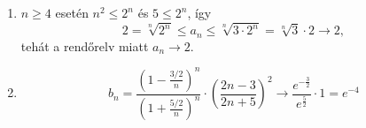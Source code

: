 \documentclass[11pt]{scrartcl}
\begin{document}
\begin{enumerate}
	\item $n \ge 4$ esetén $n^2 \le 2^n$ és $5 \le 2^n$, így
	      \[
		      2
		      = \sqrt[n]{2^n}
		      \le a_n
		      \le \sqrt[n]{3 \cdot 2^n}
		      = \sqrt[n]{3} \cdot 2
		      \to 2,
	      \]
	      tehát a rendőrelv miatt $a_n \to 2$.

	\item \[
		      b_n
		      = \frac{\left(1 - \frac{3/2}{n}\right)^n}{\left(1 + \frac{5/2}{n}\right)^n}
		      \cdot \left( \frac{2n - 3}{2n + 5} \right)^2
		      \to \frac{e^{-\frac{3}{2}}}{e^{\frac{5}{2}}} \cdot 1
		      = e^{-4}
	      \]
\end{enumerate}
\end{document}

